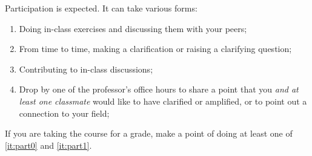 \documentclass[12pt]{article}
\begin{document}
Participation is expected. It can take various forms:
\begin{enumerate}
\item Doing in-class exercises and discussing them with your peers;
\item From time to time, making a clarification or raising a clarifying question;
\item \label{it:part0} Contributing to in-class discussions;
\item \label{it:part1} Drop by one of the professor's office hours to share a point that you \textit{and at least one classmate} would like to have clarified or amplified, or to point out a connection to your field;
\end{enumerate}
If you are taking the course for a grade, make a point of doing at
least one of \ref{it:part0} and \ref{it:part1}. %

\end{document}
